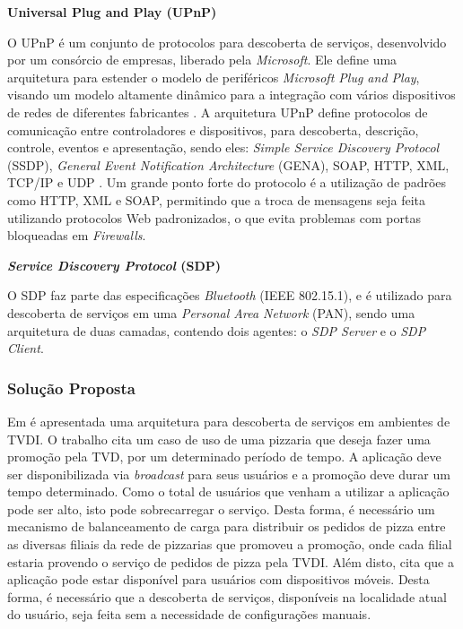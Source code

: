 \textbf{Universal Plug and Play (UPnP)}

O UPnP é um conjunto de protocolos para descoberta de serviços, desenvolvido por um consórcio de empresas, liberado pela \textit{Microsoft}. Ele define uma arquitetura para estender o modelo de periféricos \textit{Microsoft Plug and Play}, visando um modelo altamente dinâmico para a integração com vários dispositivos de redes de diferentes fabricantes \cite{borges2007arquitetura}. A arquitetura UPnP define protocolos de comunicação entre controladores e dispositivos, para descoberta, descrição, controle, eventos e apresentação, sendo eles: \textit{Simple Service Discovery Protocol} (SSDP), \textit{General Event Notification Architecture} (GENA), SOAP, HTTP, XML, TCP/IP e UDP \cite{borges2007arquitetura}. Um grande ponto forte do protocolo é a utilização de padrões como HTTP, XML e SOAP, permitindo que a troca de mensagens seja feita utilizando protocolos Web padronizados, o que evita problemas com portas bloqueadas em \textit{Firewalls}.

\textbf{\textit{Service Discovery Protocol} (SDP)}

O SDP faz parte das especificações \textit{Bluetooth} (IEEE 802.15.1), e é utilizado para descoberta de serviços em uma \textit{Personal Area Network} (PAN), sendo uma arquitetura de duas camadas, contendo dois agentes: o \textit{SDP Server} e o \textit{SDP Client}. 

\subsubsection{Solução Proposta}

Em \cite{borges2007arquitetura} é apresentada uma arquitetura para descoberta de serviços em ambientes de TVDI. O trabalho cita um caso de uso de uma pizzaria que deseja fazer uma promoção pela TVD, por um determinado período de tempo. A aplicação deve ser disponibilizada via \textit{broadcast} para seus usuários e a promoção deve durar um tempo determinado. Como o total de usuários que venham a utilizar a aplicação pode ser alto, isto pode sobrecarregar o serviço. Desta forma, é necessário um mecanismo de balanceamento de carga para distribuir os pedidos de pizza entre as diversas filiais da rede de pizzarias que promoveu a promoção, onde cada filial estaria provendo o serviço de pedidos de pizza pela TVDI. Além disto, \cite{borges2007arquitetura} cita que a aplicação pode estar disponível para usuários com dispositivos móveis. Desta forma, é necessário que a descoberta de serviços, disponíveis na localidade atual do usuário, seja feita sem a necessidade de configurações manuais.

